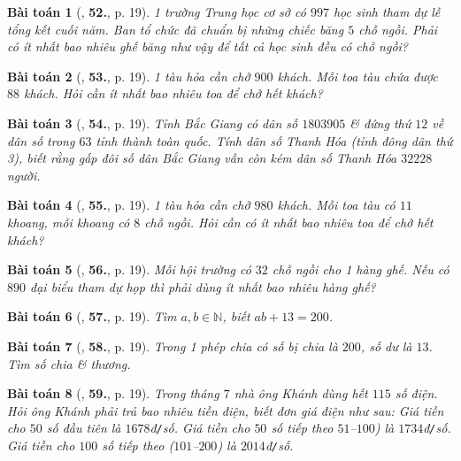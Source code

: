 \documentclass{article}
\numberwithin{equation}{section}
\newtheorem{baitoan}{Bài toán}[section]
\begin{document}
\begin{baitoan}[\cite{Trong_Toan_6_2021}, \textbf{52.}, p. 19]
	1 trường Trung học cơ sở có $997$ học sinh tham dự lễ tổng kết cuối năm. Ban tổ chức đã chuẩn bị những chiếc băng $5$ chỗ ngồi. Phải có ít nhất bao nhiêu ghế băng như vậy để tất cả học sinh đều có chỗ ngồi?
\end{baitoan}

\begin{baitoan}[\cite{Trong_Toan_6_2021}, \textbf{53.}, p. 19]
	1 tàu hỏa cần chở $900$ khách. Mỗi toa tàu chứa được $88$ khách. Hỏi cần ít nhất bao nhiêu toa để chở hết khách?
\end{baitoan}

\begin{baitoan}[\cite{Trong_Toan_6_2021}, \textbf{54.}, p. 19]
	Tỉnh Bắc Giang có dân số $1803905$ \& đứng thứ $12$ về dân số trong $63$ tỉnh thành toàn quốc. Tính dân số Thanh Hóa (tỉnh đông dân thứ 3), biết rằng gấp đôi số dân Bắc Giang vẫn còn kém dân số Thanh Hóa $32228$ người.
\end{baitoan}

\begin{baitoan}[\cite{Trong_Toan_6_2021}, \textbf{55.}, p. 19]
	1 tàu hỏa cần chở $980$ khách. Mỗi toa tàu có $11$ khoang, mỗi khoang có $8$ chỗ ngồi. Hỏi cần có ít nhất bao nhiêu toa để chở hết khách?
\end{baitoan}

\begin{baitoan}[\cite{Trong_Toan_6_2021}, \textbf{56.}, p. 19]
	Mỗi hội trường có $32$ chỗ ngồi cho 1 hàng ghế. Nếu có $890$ đại biểu tham dự họp thì phải dùng ít nhất bao nhiêu hàng ghế?
\end{baitoan}

\begin{baitoan}[\cite{Trong_Toan_6_2021}, \textbf{57.}, p. 19]
	Tìm $a,b\in\mathbb{N}$, biết $ab + 13 = 200$.
\end{baitoan}

\begin{baitoan}[\cite{Trong_Toan_6_2021}, \textbf{58.}, p. 19]
	Trong 1 phép chia có số bị chia là $200$, số dư là $13$. Tìm số chia \& thương.
\end{baitoan}

\begin{baitoan}[\cite{Trong_Toan_6_2021}, \textbf{59.}, p. 19]
	Trong tháng $7$ nhà ông Khánh dùng hết $115$ số điện. Hỏi ông Khánh phải trả bao nhiêu tiền điện, biết đơn giá điện như sau: Giá tiền cho $50$ số đầu tiên là $1678$đ\emph{\texttt{/}}số. Giá tiền cho $50$ số tiếp theo $51$--$100$) là $1734$đ\emph{\texttt{/}}số. Giá tiền cho $100$ số tiếp theo ($101$--$200$) là $2014$đ\emph{\texttt{/}}số.
\end{baitoan}
\end{document}
